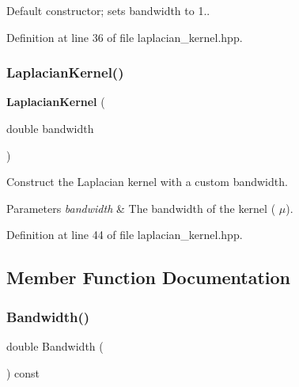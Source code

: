 Default constructor; sets bandwidth to 1.. 



Definition at line 36 of file laplacian\+\_\+kernel.\+hpp.

\mbox{\label{classmlpack_1_1kernel_1_1LaplacianKernel_adad3af357ff4d5ea13e7a146437bde42}} 
\subsubsection{Laplacian\+Kernel()\hspace{0.1cm}{\footnotesize\ttfamily [2/2]}}
{\footnotesize\ttfamily \textbf{ Laplacian\+Kernel} (\begin{DoxyParamCaption}\item[{double}]{bandwidth }\end{DoxyParamCaption})\hspace{0.3cm}{\ttfamily [inline]}}



Construct the Laplacian kernel with a custom bandwidth. 


\begin{DoxyParams}{Parameters}
{\em bandwidth} & The bandwidth of the kernel ( $\mu$). \\
\hline
\end{DoxyParams}


Definition at line 44 of file laplacian\+\_\+kernel.\+hpp.



\subsection{Member Function Documentation}
\mbox{\label{classmlpack_1_1kernel_1_1LaplacianKernel_ae9cbd816179d6c36036139ccc8fea8c8}} 
\subsubsection{Bandwidth()\hspace{0.1cm}{\footnotesize\ttfamily [1/2]}}
{\footnotesize\ttfamily double Bandwidth (\begin{DoxyParamCaption}{ }\end{DoxyParamCaption}) const\hspace{0.3cm}{\ttfamily [inline]}}



